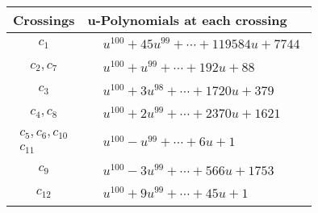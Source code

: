 \documentclass[1p]{elsarticle_modified}
\theoremstyle{definition}
\begin{document}
\begin{tabular}{m{50pt}|m{274pt}}
Crossings & \hspace{64pt}u-Polynomials at each crossing \\
\hline $$\begin{aligned}c_{1}\end{aligned}$$&$\begin{aligned}
&u^{100}+45 u^{99}+\cdots+119584 u+7744
\end{aligned}$\\
\hline $$\begin{aligned}c_{2},c_{7}\end{aligned}$$&$\begin{aligned}
&u^{100}+u^{99}+\cdots+192 u+88
\end{aligned}$\\
\hline $$\begin{aligned}c_{3}\end{aligned}$$&$\begin{aligned}
&u^{100}+3 u^{98}+\cdots+1720 u+379
\end{aligned}$\\
\hline $$\begin{aligned}c_{4},c_{8}\end{aligned}$$&$\begin{aligned}
&u^{100}+2 u^{99}+\cdots+2370 u+1621
\end{aligned}$\\
\hline $$\begin{aligned}c_{5},c_{6},c_{10}\\c_{11}\end{aligned}$$&$\begin{aligned}
&u^{100}- u^{99}+\cdots+6 u+1
\end{aligned}$\\
\hline $$\begin{aligned}c_{9}\end{aligned}$$&$\begin{aligned}
&u^{100}-3 u^{99}+\cdots+566 u+1753
\end{aligned}$\\
\hline $$\begin{aligned}c_{12}\end{aligned}$$&$\begin{aligned}
&u^{100}+9 u^{99}+\cdots+45 u+1
\end{aligned}$\\
\hline
\end{tabular}\\~\\
\end{document}
